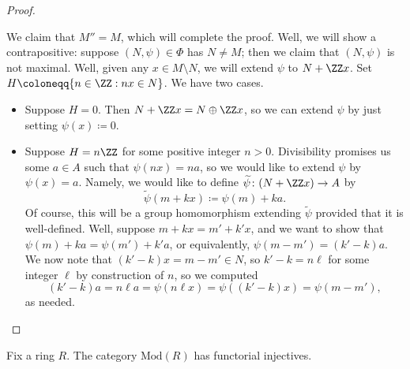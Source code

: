 \documentclass[../notes.tex]{subfiles}
\begin{document}
\begin{proof}
\begin{itemize}
		We claim that $M''=M$, which will complete the proof. Well, we will show a contrapositive: suppose $(N,\psi)\in\Phi$ has $N\ne M$; then we claim that $(N,\psi)$ is not maximal. Well, given any $x\in M\setminus N$, we will extend $\psi$ to $N+\ZZ x$. Set $H\coloneqq\{n\in\ZZ:nx\in N\}$. We have two cases.
		\begin{itemize}
			\item Suppose $H=0$. Then $N+\ZZ x=N\oplus\ZZ x$, so we can extend $\psi$ by just setting $\psi(x)\coloneqq0$.
			\item Suppose $H=n\ZZ$ for some positive integer $n>0$. Divisibility promises us some $a\in A$ such that $\psi(nx)=na$, so we would like to extend $\psi$ by $\psi(x)=a$. Namely, we would like to define $\widetilde\psi\colon(N+\ZZ x)\to A$ by
			\[\widetilde\psi(m+kx)\coloneqq\psi(m)+ka.\]
			Of course, this will be a group homomorphism extending $\widetilde\psi$ provided that it is well-defined. Well, suppose $m+kx=m'+k'x$, and we want to show that $\psi(m)+ka=\psi(m')+k'a$, or equivalently, $\psi(m-m')=(k'-k)a$. We now note that $(k'-k)x=m-m'\in N$, so $k'-k=n\ell$ for some integer $\ell$ by construction of $n$, so we computed
			\[(k'-k)a=n\ell a=\psi(n\ell x)=\psi((k'-k)x)=\psi(m-m'),\]
			as needed.
			\qedhere
		\end{itemize}
	\end{itemize}
\end{proof}
\begin{theorem} \label{thm:mod-r-inj}
	Fix a ring $R$. The category $\mathrm{Mod}(R)$ has functorial injectives.
\end{theorem}
\end{document}
